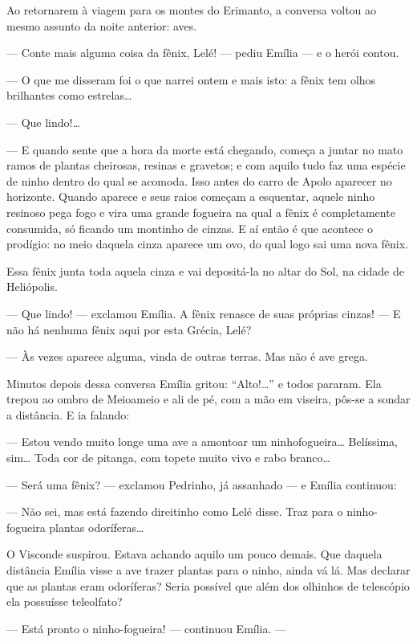 Ao retornarem à viagem para os montes do Erimanto, a conversa voltou ao
mesmo assunto da noite anterior: aves.

--- Conte mais alguma coisa da fênix, Lelé! --- pediu Emília --- e o
herói contou.

--- O que me disseram foi o que narrei ontem e mais isto: a fênix tem
olhos brilhantes como estrelas\ldots{}

--- Que lindo!\ldots{}

--- E quando sente que a hora da morte está chegando, começa a juntar no
mato ramos de plantas cheirosas, resinas e gravetos; e com aquilo tudo
faz uma espécie de ninho dentro do qual se acomoda. Isso antes do carro
de Apolo aparecer no horizonte. Quando aparece e seus raios começam a
esquentar, aquele ninho resinoso pega fogo e vira uma grande fogueira na
qual a fênix é completamente consumida, só ficando um montinho de
cinzas. E aí então é que acontece o prodígio: no meio daquela cinza
aparece um ovo, do qual logo sai uma nova fênix.

Essa fênix junta toda aquela cinza e vai depositá-la no altar do Sol, na
cidade de Heliópolis.

--- Que lindo! --- exclamou Emília. A fênix renasce de suas próprias
cinzas! --- E não há nenhuma fênix aqui por esta Grécia, Lelé?

--- Às vezes aparece alguma, vinda de outras terras. Mas não é ave
grega.

Minutos depois dessa conversa Emília gritou: ``Alto!\ldots{}'' e todos
pararam. Ela trepou ao ombro de Meioameio e ali de pé, com a mão em
viseira, pôs-se a sondar a distância. E ia falando:

--- Estou vendo muito longe uma ave a amontoar um ninhofogueira\ldots{}
Belíssima, sim\ldots{} Toda cor de pitanga, com topete muito vivo e rabo
branco\ldots{}

--- Será uma fênix? --- exclamou Pedrinho, já assanhado --- e Emília
continuou:

--- Não sei, mas está fazendo direitinho como Lelé disse. Traz para o
ninho-fogueira plantas odoríferas\ldots{}

O Visconde suspirou. Estava achando aquilo um pouco demais. Que daquela
distância Emília visse a ave trazer plantas para o ninho, ainda vá lá.
Mas declarar que as plantas eram odoríferas? Seria possível que além dos
olhinhos de telescópio ela possuísse teleolfato?

--- Está pronto o ninho-fogueira! --- continuou Emília. ---

